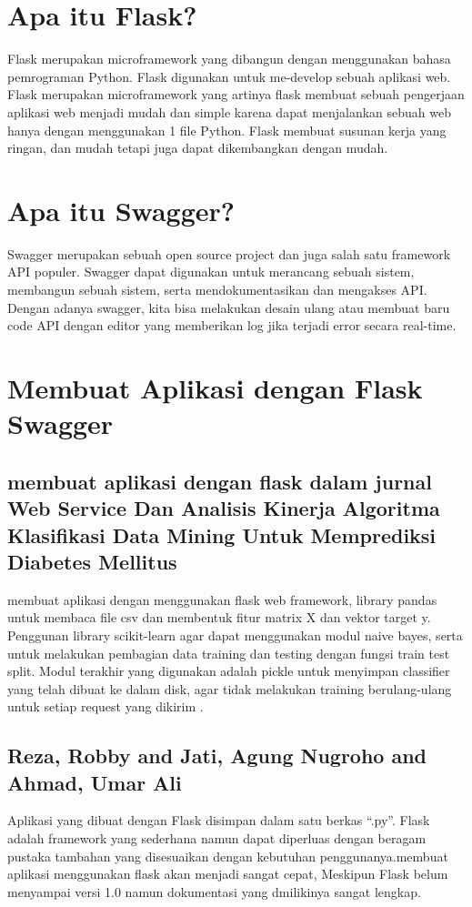 \documentclass[12pt]{article}
\begin{document}
\section{Apa itu Flask?}
Flask merupakan microframework yang dibangun dengan
menggunakan bahasa pemrograman Python. Flask digunakan
untuk me-develop sebuah aplikasi web. Flask merupakan
microframework yang artinya flask membuat sebuah pengerjaan
aplikasi web menjadi mudah dan simple karena dapat menjalankan
sebuah web hanya dengan menggunakan 1 file Python. Flask
membuat susunan kerja yang ringan, dan mudah tetapi juga dapat
dikembangkan dengan mudah\cite{gunawan2018aplikasi}.

\section{Apa itu Swagger?}
Swagger merupakan sebuah open source project dan juga salah satu framework API populer. Swagger dapat digunakan untuk merancang sebuah sistem, membangun sebuah sistem, serta mendokumentasikan dan mengakses API. Dengan adanya swagger, kita bisa melakukan desain ulang atau membuat baru code API dengan editor yang memberikan log jika terjadi error secara real-time.

\section{Membuat Aplikasi dengan Flask Swagger}

\subsection{membuat aplikasi dengan flask dalam jurnal Web Service Dan  Analisis Kinerja Algoritma Klasifikasi Data Mining Untuk Memprediksi Diabetes Mellitus}
membuat aplikasi dengan menggunakan flask web framework, library pandas untuk membaca file csv dan membentuk fitur matrix X dan vektor target y. Penggunan library scikit-learn agar dapat menggunakan modul naive bayes, serta untuk melakukan pembagian data training dan testing dengan fungsi train test split. Modul terakhir yang digunakan adalah pickle untuk menyimpan classifier yang telah dibuat ke dalam disk, agar tidak melakukan training berulang-ulang untuk setiap request yang dikirim \cite{setyawan2017implementasi}. 

\subsection{Reza, Robby and Jati, Agung Nugroho and Ahmad, Umar Ali}
Aplikasi yang dibuat dengan Flask disimpan dalam satu berkas “.py”. Flask adalah framework yang sederhana namun dapat diperluas dengan beragam pustaka tambahan yang disesuaikan dengan kebutuhan penggunanya.membuat aplikasi menggunakan flask akan menjadi sangat cepat, Meskipun Flask belum menyampai versi 1.0 namun dokumentasi yang dmilikinya sangat lengkap\cite{reza2016perancangan}. 
\end{document}
